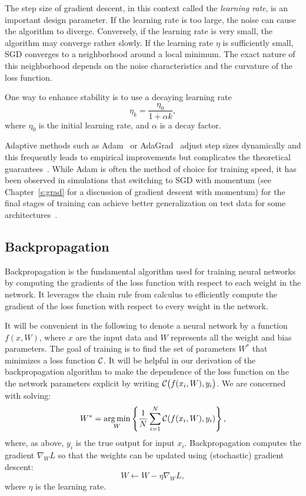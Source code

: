 The step size of gradient descent, in this context called the \emph{learning rate}, is an important design parameter. If the learning rate is too large, the noise can cause the algorithm to diverge. Conversely, if the learning rate is very small, the algorithm may converge rather slowly.
If the learning rate $ \eta $ is sufficiently small, SGD converges to a neighborhood around a local minimum. The exact nature of this neighborhood depends on the noise characteristics and the curvature of the loss function.

One way to enhance stability is to use a decaying learning rate
$$
\eta_k = \frac{\eta_0}{1 + \alpha k},
$$
where $ \eta_0 $ is the initial learning rate, and $ \alpha $ is a decay factor. 

\medskip

Adaptive methods such as Adam~\cite{kingma2014adam} or AdaGrad~\cite{duchi2011adaptive} adjust step sizes dynamically and this frequently leads to empirical improvements but complicates the theoretical guarantees~\cite{ward2020adagrad}.
While Adam is often the method of choice for training speed, it has been observed in simulations that switching to SGD with momentum (see Chapter~\ref{s:grad} for a discussion of gradient descent with momentum) for the final stages of training can achieve better generalization on test data for some architectures~\cite{wilson2017marginal}.





\subsection{Backpropagation}


Backpropagation is the fundamental algorithm used for training neural networks by computing the gradients of the loss function with respect to each weight in the network. It leverages the chain rule from calculus to efficiently compute the gradient of the loss function with respect to every weight in the network.


It will be convenient in the following to denote a neural network by a function $f(x,W)$, where $x$ are the input data and $W$ represents all the weight and bias parameters. The goal of training is to find the set of parameters $W^*$ that minimizes a loss function ${\mathcal C}$. It will be helpful in our derivation of the backpropagation algorithm to make the dependence of the loss function on the
the network parameters explicit by writing ${\mathcal C}\big(f(x_i, W), y_i\big)$.
We  are concerned with solving:
$$W^* = \underset{W}{\arg\min} \left\{ \frac{1}{N} \sum_{i=1}^N {\mathcal C}(f(x_i, W), y_i) \right\},$$
where, as above, $y_i$ is the true output for input ${x}_i$. Backpropagation computes the gradient $\nabla_{W} L$ so that the weights can be updated using (stochastic) gradient descent:
$$W \leftarrow W - \eta \nabla_{W} L,$$
where $\eta$ is the learning rate.


